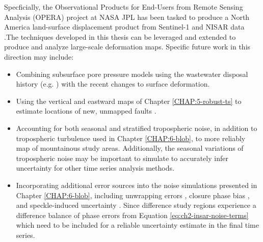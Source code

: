 Specficially, the Observational Products for End-Users from Remote Sensing Analysis (OPERA) project at NASA JPL has been tasked to produce a North America land-surface displacement product from Sentinel-1 and NISAR data
\citep{Bekaert2021IntroducingOperaProject}.The techniques developed in this thesis can be leveraged and extended to produce and analyze large-scale deformation maps. 
Specific future work in this direction may include:

\begin{itemize}



\item Combining subsurface pore pressure models using the wastewater disposal history (e.g. \cite{Ge2022RecentWaterDisposal}) with the recent changes to surface deformation.

\item Using the vertical and eastward maps of Chapter \ref{CHAP:5-robust-ts} to estimate locations of new, unmapped faults \citep{Horne2021BasementRootedFaults}.



\item Accounting for both seasonal and stratified tropospheric noise, in addition to tropospheric turbulence used in Chapter \ref{CHAP:6-blob}, to more reliably map of mountainous study areas. Additionally, the seasonal variations of tropospheric noise may be important to simulate to accurately infer uncertainty for other time series analysis methods.

\item Incorporating additional error sources into the noise simulations presented in Chapter \ref{CHAP:6-blob}, including unwrapping errors \citep{Yunjun2019SmallBaselineInsar}, closure phase bias \citep{Zheng2022ClosurePhaseSystematic}, and speckle-induced uncertainty \citep{Zwieback2022ReliableInsarPhase}. 
Since difference study regions experience  a difference balance of phase errors from Equation \eqref{eq:ch2-insar-noise-terms} which need to be included for a reliable uncertainty estimate in the final time series.


\end{itemize}

